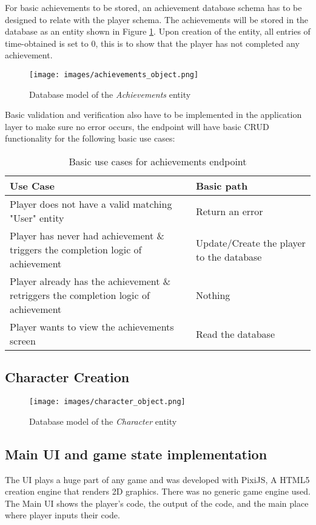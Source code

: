 For basic achievements to be stored, an achievement database schema has to be designed to relate with the player schema. The achievements will be stored in the database as an entity shown in Figure \ref{fig:achievements_object}. Upon creation of the entity, all entries of time-obtained is set to 0, this is to show that the player has not completed any achievement.
\begin{figure}[H]
    \centering
    \texttt{[image: images/achievements\_object.png]}
    \caption{Database model of the \textit{Achievements} entity}    
    \label{fig:achievements_object}
\end{figure}
Basic validation and verification also have to be implemented in the application layer to make sure no error occurs, the endpoint will have basic CRUD functionality for the following basic use cases:
\begin{table}[H]
    \caption{Basic use cases for achievements endpoint}
    \begin{tabular}{|p{11cm}|p{5cm}|}
        \hline
        Use Case & Basic path\\
        \hline
        Player does not have a valid matching "User" entity & Return an error\\
        \hline
        Player has never had achievement \& triggers the completion logic of achievement & Update/Create the player to the database\\
        \hline
        Player already has the achievement \& retriggers the completion logic of achievement & Nothing \\
        \hline
        Player wants to view the achievements screen & Read the database\\
        \hline
    \end{tabular}
\end{table}
\subsection{Character Creation}
\begin{figure}
    \centering
    \texttt{[image: images/character\_object.png]}
    \caption{Database model of the \textit{Character} entity}
    \label{fig:character}
\end{figure}
\subsection{Main UI and game state implementation}
The UI plays a huge part of any game and was developed with PixiJS, A HTML5 creation engine that renders 2D graphics. There was no generic game engine used. The Main UI shows the player's code, the output of the code, and the main place where player inputs their code.

